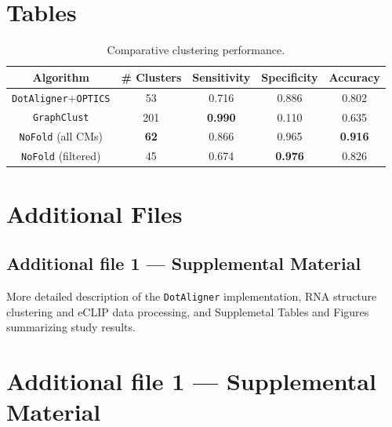 \documentclass{bmcart}
\newcommand\dotaligner{\texttt{DotAligner}}
\begin{document}
\begin{backmatter}

\section*{Tables}

\begin{table}[h!]
\caption{ Comparative clustering performance. }
 \begin{tabular}{ccccc}
 \hline
 Algorithm & \# Clusters & Sensitivity & Specificity & Accuracy \\
 \hline
 \dotaligner{}+\texttt{OPTICS} & 53 & 0.716 & 0.886& 0.802\\
 \texttt{GraphClust} & 201 & \textbf{0.990} & 0.110 & 0.635\\ %
 \texttt{NoFold} (all CMs) & \textbf{62} & 0.866 & 0.965 & \textbf{0.916 }\\ %
 \texttt{NoFold} (filtered) & 45 & 0.674 & \textbf{0.976} & 0.826\\ %
 \hline
 \end{tabular}
\end{table}





\section*{Additional Files}
  \subsection*{Additional file 1 --- Supplemental Material}
    More detailed description of the \dotaligner{} implementation, RNA structure clustering and eCLIP data processing, and Supplemetal Tables and Figures summarizing study results.

\end{backmatter}

\clearpage

\section*{Additional file 1 --- Supplemental Material}
\end{document}
